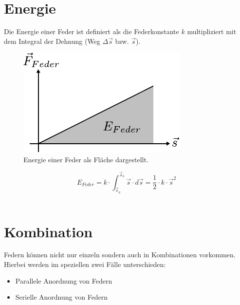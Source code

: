 \section{Energie}\label{sec:feder-energie}
Die Energie einer Feder ist definiert als die Federkonstante $k$ multipliziert
mit dem Integral der Dehnung (Weg $\Delta \vec{s}$ bzw. $\vec{s}$).
\begin{figure}[h!]
	\centering
	\includegraphics[scale=0.9]{feder-energie.pdf}
	\caption{Energie einer Feder als Fläche dargestellt.}
	\label{fig:feder-energie}
\end{figure}

\[ \boxed{E_{Feder} 
	= k \cdot \int_{\vec{s}_a}^{\vec{s}_b} \vec{s} \cdot d\vec{s} 
	= \frac{1}{2} \cdot k \cdot \vec{s}^2
} \] \\

\section{Kombination}
Federn können nicht nur einzeln sondern auch in Kombinationen vorkommen. 
Hierbei werden im speziellen zwei Fälle unterschieden:

\begin{itemize}
	\item Parallele Anordnung von Federn
	\item Serielle Anordnung von Federn
\end{itemize}

